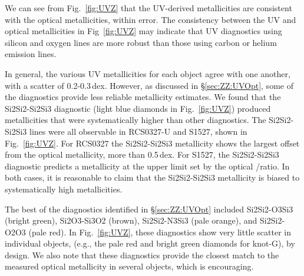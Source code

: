 We can see from Fig.~\ref{fig:UVZ} that the UV-derived metallicities are consistent with the optical metallicities, within error. The consistency between the UV and optical metallicities in Fig~\ref{fig:UVZ} may indicate that UV diagnostics using silicon and oxygen lines are more robust than those using carbon or helium emission lines.

In general, the various UV metallicities for each object agree with one another, with a scatter of 0.2-0.3\,dex. However, as discussed in \S\ref{sec:ZZ:UVOpt}, some of the diagnostics provide less reliable metallicity estimates. We found that the Si2Si2-Si2Si3 diagnostic (light blue diamonds in Fig.~\ref{fig:UVZ}) produced metallicities that were systematically higher than other diagnostics. The Si2Si2-Si2Si3 lines were all observable in RCS0327-U and S1527, shown in Fig.~\ref{fig:UVZ}. For RCS0327 the Si2Si2-Si2Si3 metallicity shows the largest offset from the optical metallicity, more than 0.5\,dex. For S1527, the Si2Si2-Si2Si3 diagnostic predicts a metallicity at the upper limit set by the optical \nii/\ha ratio. In both cases, it is reasonable to claim that the Si2Si2-Si2Si3 metallicity is biased to systematically high metallicities.

The best of the diagnostics identified in \S\ref{sec:ZZ:UVOpt} included Si2Si2-O3Si3 (bright green), Si2O3-Si3O2 (brown), Si2Si2-N3Si3 (pale orange), and Si2Si2-O2O3 (pale red). In Fig.~\ref{fig:UVZ}, these diagnostics show very little scatter in individual objects, (e.g., the pale red and bright green diamonds for knot-G), by design. We also note that these diagnostics provide the closest match to the measured optical metallicity in several objects, which is encouraging.

